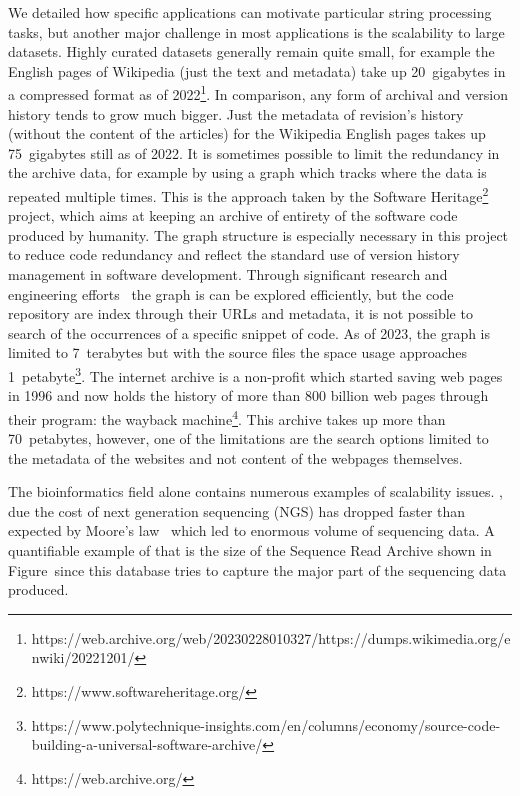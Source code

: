 We detailed how specific applications can motivate particular string processing tasks, but another major challenge in most applications is the scalability to large datasets.
Highly curated datasets generally remain quite small, for example the English pages of Wikipedia (just the text and metadata) take up 20~gigabytes in a compressed format as of 2022\footnote{https://web.archive.org/web/20230228010327/https://dumps.wikimedia.org/enwiki/20221201/}. In comparison, any form of archival and version history tends to grow much bigger. Just the metadata of revision's history (without the content of the articles) for the Wikipedia English pages takes up 75~gigabytes still as of 2022.
It is sometimes possible to limit the redundancy in the archive data, for example by using a graph which tracks where the data is repeated multiple times. This is the approach taken by the Software Heritage\footnote{https://www.softwareheritage.org/} project, which aims at keeping an archive of entirety of the software code produced by humanity. The graph structure is especially necessary in this project to reduce code redundancy and reflect the standard use of version history management in software development. Through significant research and engineering efforts~\cite{DBLP:phd/hal/Pietri21} the graph is can be explored efficiently, but the code repository are index through their URLs and metadata, it is not possible to search of the occurrences of a specific snippet of code. As of 2023, the graph is limited to 7~terabytes but with the source files the space usage approaches 1~petabyte\footnote{https://www.polytechnique-insights.com/en/columns/economy/source-code-building-a-universal-software-archive/}.
The internet archive is a non-profit which started saving web pages in 1996 and now holds the history of more than 800 billion web pages through their program: the wayback machine\footnote{https://web.archive.org/}. This archive takes up more than 70~petabytes, however, one of the limitations are the search options limited to the metadata of the websites and not content of the webpages themselves.

The bioinformatics field alone contains numerous examples of scalability issues.
, due the cost of next generation sequencing (NGS) has dropped faster than expected by Moore's law~\cite{muir2016real} which led to enormous volume of sequencing data. A quantifiable example of that is the size of the Sequence Read Archive shown in Figure~since this database tries to capture the major part of the sequencing data produced.

